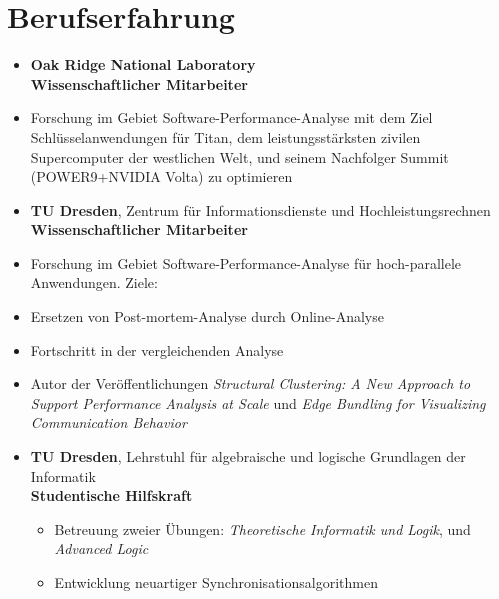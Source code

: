 \section*{Berufserfahrung}
\begin{itemize}
	\item {}
		\textbf{Oak Ridge National Laboratory} \\
		\textbf{Wissenschaftlicher Mitarbeiter}
	\item Forschung im Gebiet Software-Performance-Analyse mit dem Ziel Schl\"usselanwendungen f\"ur Titan, dem leistungsst\"arksten zivilen Supercomputer der westlichen Welt, und seinem Nachfolger Summit (POWER9+NVIDIA Volta) zu optimieren

	\item {}
		\textbf{TU Dresden}, Zentrum f\"ur Informationsdienste und Hochleistungsrechnen \\
		\textbf{Wissenschaftlicher Mitarbeiter}
		\item Forschung im Gebiet Software-Performance-Analyse f\"ur hoch-parallele Anwendungen. Ziele:
			\item \hspace{1em} Ersetzen von Post-mortem-Analyse durch Online-Analyse
			\item \hspace{1em} Fortschritt in der vergleichenden Analyse
		\item Autor der Ver\"offentlichungen
			\emph{Structural Clustering: A New Approach to Support Performance Analysis at Scale} und
			\emph{Edge Bundling for Visualizing Communication Behavior}

	\item {}
		\textbf{TU Dresden}, Lehrstuhl f\"ur algebraische und logische Grundlagen der Informatik \\
		\textbf{Studentische Hilfskraft}
		\begin{itemize}
			\item Betreuung zweier \"Ubungen: \textit{Theoretische Informatik und Logik}, und \textit{Advanced Logic}
			\item Entwicklung neuartiger Synchronisationsalgorithmen
		\end{itemize}


\end{itemize}
